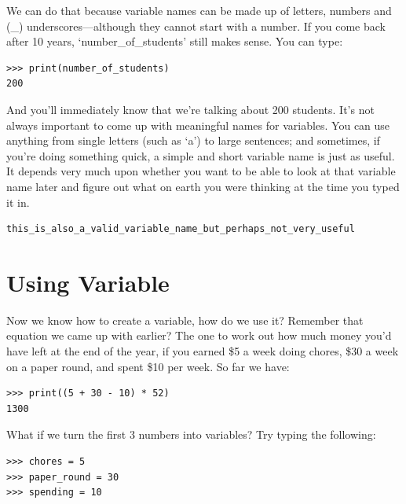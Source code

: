 We can do that because variable names can be made up of letters, numbers and (\_) underscores---although they cannot start with a number.  If you come back after 10 years, `number\_of\_students' still makes sense.  You can type:

\begin{listing}
\begin{verbatim}
>>> print(number_of_students)
200
\end{verbatim}
\end{listing}

\noindent
And you'll immediately know that we're talking about 200 students.  It's not always important to come up with meaningful names for variables.  You can use anything from single letters (such as `a') to large sentences; and sometimes, if you're doing something quick, a simple and short variable name is just as useful.  It depends very much upon whether you want to be able to look at that variable name later and figure out what on earth you were thinking at the time you typed it in.

\begin{listing}
\begin{verbatim}
this_is_also_a_valid_variable_name_but_perhaps_not_very_useful
\end{verbatim}
\end{listing}

\section{Using Variable}

Now we know how to create a variable, how do we use it?  Remember that equation we came up with earlier?  The one to work out how much money you'd have left at the end of the year, if you earned \$5 a week doing chores, \$30 a week on a paper round, and spent \$10 per week.  So far we have:

\begin{listing}
\begin{verbatim}
>>> print((5 + 30 - 10) * 52)
1300
\end{verbatim}
\end{listing}

\noindent
What if we turn the first 3 numbers into variables?  Try typing the following:

\begin{listing}
\begin{verbatim}
>>> chores = 5
>>> paper_round = 30
>>> spending = 10
\end{verbatim}
\end{listing}

